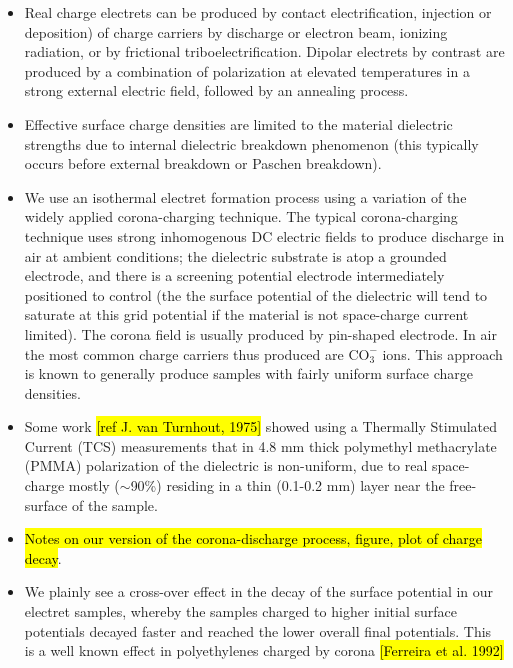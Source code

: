 \documentclass[10pt,a4paper]{article}
\begin{document}
\begin{itemize}
\item Real charge electrets can be produced by contact electrification, injection or deposition) of charge carriers by discharge or electron beam, ionizing radiation, or by frictional triboelectrification. Dipolar electrets by contrast are produced by a combination of polarization at elevated temperatures in a strong external electric field, followed by an annealing process.
\item Effective surface charge densities are limited to the material dielectric strengths due to internal dielectric breakdown phenomenon (this typically occurs before external breakdown or Paschen breakdown).
\item We use an isothermal electret formation process using a variation of the widely applied corona-charging technique. The typical corona-charging technique uses strong inhomogenous DC electric fields to produce discharge in air at ambient conditions; the dielectric substrate is atop a grounded electrode, and there is a screening potential electrode intermediately positioned to control (the the surface potential of the dielectric will tend to saturate at this grid potential if the material is not space-charge current limited). The corona field is usually produced by pin-shaped electrode. In air the most common charge carriers thus produced are $\mbox{CO}_3^-$ ions. This approach is known to generally produce samples with fairly uniform surface charge densities.
\item Some work \hl{[ref J. van Turnhout, 1975]} showed using a Thermally Stimulated Current (TCS) measurements that in 4.8 mm thick polymethyl methacrylate (PMMA) polarization of the dielectric is non-uniform, due to real space-charge mostly ($\sim$90\%) residing in a thin (0.1-0.2 mm) layer near the free-surface of the sample.
\item \hl{Notes on our version of the corona-discharge process, figure, plot of charge decay}.
\item We plainly see a cross-over effect in the decay of the surface potential in our electret samples, whereby the samples charged to higher initial surface potentials decayed faster and reached the lower overall final potentials. This is a well known effect in polyethylenes charged by corona \hl{[Ferreira et al. 1992]}
\end{itemize}
\end{document}
